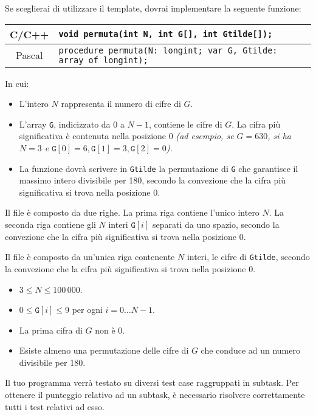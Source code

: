 Se sceglierai di utilizzare il template, dovrai implementare la seguente funzione:
\begin{center}\begin{tabularx}{\textwidth}{|c|X|}
\hline
C/C++  & \verb|void permuta(int N, int G[], int Gtilde[]);|\\
\hline
Pascal & \verb|procedure permuta(N: longint; var G, Gtilde: array of longint);|\\
\hline
\end{tabularx}\end{center}
In cui:
\begin{itemize}[nolistsep]
  \item L'intero $N$ rappresenta il numero di cifre di $G$.
  \item L'array \texttt{G}, indicizzato da $0$ a $N-1$, contiene le cifre di $G$. La cifra più significativa è contenuta nella posizione $0$ \emph{(ad esempio, se $G = 630$, si ha $N = 3$ e $\texttt{G}[0] = 6, \texttt{G}[1] = 3, \texttt{G}[2] = 0$).}
  \item La funzione dovrà scrivere in \texttt{Gtilde} la permutazione di \texttt{G} che garantisce il massimo intero divisibile per 180, secondo la convezione che la cifra più significativa si trova nella posizione $0$.
\end{itemize}

\InputFile
Il file  è composto da due righe. La prima riga contiene l'unico intero $N$. La seconda riga contiene gli $N$ interi $\texttt{G}[i]$ separati da uno spazio, secondo la convezione che la cifra più significativa si trova nella posizione $0$.

\OutputFile
Il file \outputfile{} è composto da un'unica riga contenente $N$ interi, le cifre di \texttt{Gtilde}, secondo la convezione che la cifra più significativa si trova nella posizione $0$.

\Constraints
\begin{itemize}[nolistsep, itemsep=2mm]
	\item $3 \le N \le 100\,000$.
	\item $0 \le \texttt{G}[i] \le 9$ per ogni $i=0\ldots N-1$.
	\item La prima cifra di $G$ non è 0.
	\item Esiste almeno una permutazione delle cifre di $G$ che conduce ad un numero divisibile per 180.
\end{itemize}

\Scoring
Il tuo programma verrà testato su diversi test case raggruppati in subtask.
Per ottenere il punteggio relativo ad un subtask, è necessario risolvere
correttamente tutti i test relativi ad esso.

